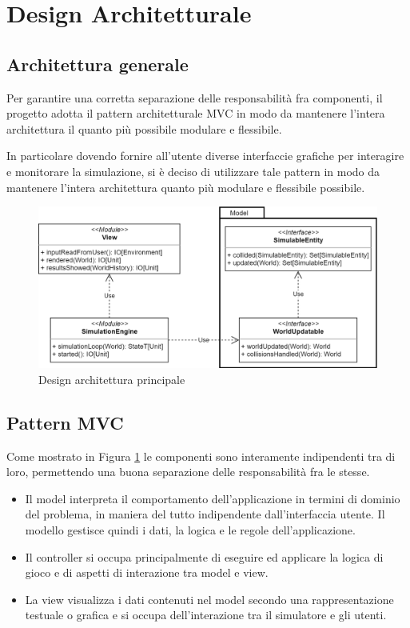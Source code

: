 \section{Design Architetturale}

\subsection{Architettura generale}



Per garantire una corretta separazione delle responsabilità fra componenti, il progetto adotta il pattern architetturale MVC in modo da mantenere l’intera architettura il quanto più possibile modulare e flessibile.

In particolare dovendo fornire all'utente diverse interfaccie grafiche per interagire e monitorare la simulazione, si è deciso di utilizzare tale pattern in modo da mantenere l’intera architettura quanto più modulare e flessibile possibile.

\begin{figure}[h!]
\centering
\includegraphics[width=\textwidth, scale=0.44]{img/MainArchitecture.png}
\caption{Design architettura principale}
\label{fig:mainarchitecture}
\end{figure}

\subsection{Pattern MVC}
Come mostrato in Figura \ref{fig:mainarchitecture} le componenti sono interamente indipendenti tra di loro, permettendo una buona separazione delle responsabilità fra le stesse.

\begin{itemize}
    \item Il model interpreta il comportamento dell’applicazione in termini di dominio del problema, in maniera del tutto indipendente dall’interfaccia utente. Il modello gestisce quindi i dati, la logica e le regole dell’applicazione.
    \item Il controller si occupa principalmente di eseguire ed applicare la logica di gioco e di aspetti di interazione tra model e view.
    \item La view visualizza i dati contenuti nel model secondo una rappresentazione testuale o grafica e si occupa dell'interazione tra il simulatore e gli utenti.
\end{itemize}


